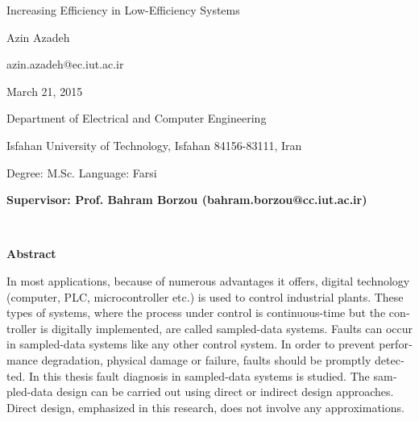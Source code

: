 \thispagestyle{empty}

\begin{latin}
\begin{center}

{\Huge Increasing Efficiency in Low-Efficiency Systems}

\vspace{1cm}

{\LARGE{Azin Azadeh}}

\vspace{0.2cm}

{\small azin.azadeh@ec.iut.ac.ir}

\vspace{0.5cm}

March 21, 2015

\vspace{0.5cm}

Department of Electrical and Computer Engineering

\vspace{0.2cm}

Isfahan University of Technology, Isfahan 84156-83111, Iran

\vspace{0.2cm}

Degree: M.Sc. \hspace*{3cm} Language: Farsi

\vspace{1cm}

{\small\textbf{Supervisor: Prof. Bahram Borzou (bahram.borzou@cc.iut.ac.ir)}}
\end{center}
~\vfill



\noindent\textbf{Abstract}

\begin{small}
\baselineskip=0.6cm
In most applications, because of numerous advantages it offers,
digital technology (computer, PLC, microcontroller etc.) is used to
control industrial plants. These types of systems, where the process
under control is continuous-time but the controller is digitally
implemented, are called sampled-data systems. Faults can occur in
sampled-data systems like any other control system. In order to
prevent performance degradation, physical damage or failure, faults
should be promptly detected. In this thesis fault diagnosis in
sampled-data systems is studied. The sampled-data design can be
carried out using direct or indirect design approaches. Direct
design, emphasized in this research, does not involve any
approximations.


\end{small}
\end{latin}
